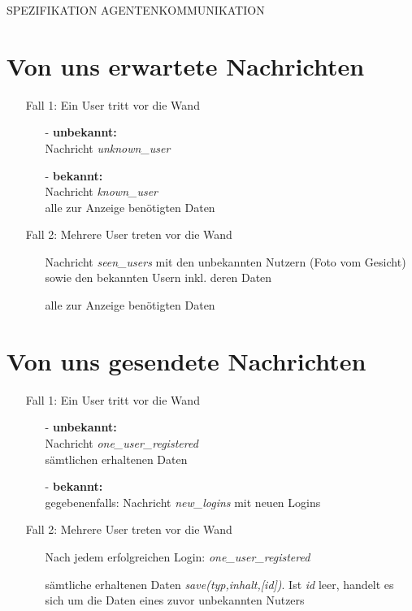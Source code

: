 \documentclass[10pt,a4paper]{article}
\begin{document}
\begin{center}
\Huge{SPEZIFIKATION AGENTENKOMMUNIKATION}
\end{center}
\section{Von uns erwartete Nachrichten}
\begin{itemize}
\item[] Fall 1: Ein User tritt vor die Wand
	\begin{itemize}
	\item[-] \textbf{unbekannt:}\\
		Nachricht \textit{unknown\_user}
	\item[-] \textbf{bekannt:}\\
		Nachricht \textit{known\_user}\\
		 alle zur Anzeige benötigten Daten
	\end{itemize}
\item[] Fall 2: Mehrere User treten vor die Wand
	\begin{itemize}
			\item[] Nachricht \textit{seen\_users} mit den unbekannten Nutzern (Foto vom Gesicht) sowie den bekannten Usern inkl. deren Daten
			 \item[] alle zur Anzeige benötigten Daten
	\end{itemize}
\end{itemize}
\section{Von uns gesendete Nachrichten}
\begin{itemize}
\item[] Fall 1: Ein User tritt vor die Wand
	\begin{itemize}
	\item[-] \textbf{unbekannt:}\\
		Nachricht \textit{one\_user\_registered}\\
		sämtlichen erhaltenen Daten
	\item[-] \textbf{bekannt:}\\
		gegebenenfalls: Nachricht \textit{new\_logins} mit neuen Logins
	\end{itemize}
\item[] Fall 2: Mehrere User treten vor die Wand
\begin{itemize}
		\item[] Nach jedem erfolgreichen Login: \textit{one\_user\_registered}
		\item[]sämtliche erhaltenen Daten \textit{save(typ,inhalt,[id])}. Ist \textit{id} leer, handelt es sich um die Daten eines zuvor unbekannten Nutzers
		\end{itemize}
\end{itemize}
\end{document}
